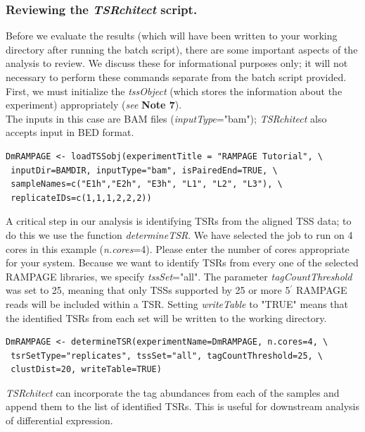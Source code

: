 \documentclass[runningheads,a4paper]{llncs}
\begin{document}
\begin{linenumbers}
\subsubsection{Reviewing the \textit{TSRchitect} script.} 
Before we evaluate the results (which will have been written to your working directory after running the batch script), there are some important aspects of the analysis to review. 
We discuss these for informational purposes only; it will not necessary to perform these commands separate from the batch script provided.
First, we must initialize the \textit{tssObject} (which stores the information about the experiment) appropriately (\textit{see} \textbf{Note 7}).\\

\noindent
The inputs in this case are BAM files (\textit{inputType}="bam"); \textit{TSRchitect} also accepts input in BED format.

\noindent
\begin{verbatim}
DmRAMPAGE <- loadTSSobj(experimentTitle = "RAMPAGE Tutorial", \
 inputDir=BAMDIR, inputType="bam", isPairedEnd=TRUE, \
 sampleNames=c("E1h","E2h", "E3h", "L1", "L2", "L3"), \
 replicateIDs=c(1,1,1,2,2,2))
\end{verbatim}

\noindent
A critical step in our analysis is identifying TSRs from the aligned TSS data; to do this we use the function \textit{determineTSR}. 
We have selected the job to run on 4 cores in this example (\textit{n.cores}=4). 
Please enter the number of cores appropriate for your system.
Because we want to identify TSRs from every one of the selected RAMPAGE libraries, we specify \textit{tssSet}="all".
The parameter \textit{tagCountThreshold} was set to 25, meaning that only TSSs supported by 25 or more 5$^\prime$ RAMPAGE reads will be included within a TSR.
Setting \textit{writeTable} to "TRUE" means that the identified TSRs from each set will be written to the working directory. 

\noindent
\begin{verbatim}
DmRAMPAGE <- determineTSR(experimentName=DmRAMPAGE, n.cores=4, \
 tsrSetType="replicates", tssSet="all", tagCountThreshold=25, \
 clustDist=20, writeTable=TRUE)
\end{verbatim}

\textit{TSRchitect} can incorporate the tag abundances from each of the samples and append them to the list of identified TSRs. 
This is useful for downstream analysis of differential expression.


\end{linenumbers}
\end{document}
